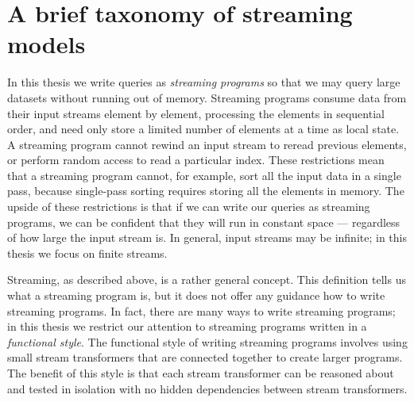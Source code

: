 \chapter{A brief taxonomy of streaming models}
\label{taxonomy}

In this thesis we write queries as \emph{streaming programs} so that we may query large datasets without running out of memory.
Streaming programs consume data from their input streams element by element, processing the elements in sequential order, and need only store a limited number of elements at a time as local state.
A streaming program cannot rewind an input stream to reread previous elements, or perform random access to read a particular index.
These restrictions mean that a streaming program cannot, for example, sort all the input data in a single pass, because single-pass sorting requires storing all the elements in memory.
The upside of these restrictions is that if we can write our queries as streaming programs, we can be confident that they will run in constant space --- regardless of how large the input stream is.
In general, input streams may be infinite; in this thesis we focus on finite streams.


Streaming, as described above, is a rather general concept.
This definition tells us what a streaming program is, but it does not offer any guidance how to write streaming programs.
In fact, there are many ways to write streaming programs; in this thesis we restrict our attention to streaming programs written in a \emph{functional style}.
The functional style of writing streaming programs involves using small stream transformers that are connected together to create larger programs.
The benefit of this style is that each stream transformer can be reasoned about and tested in isolation with no hidden dependencies between stream transformers.

